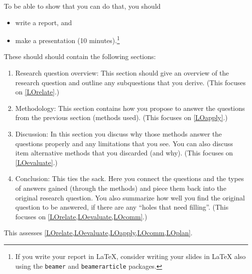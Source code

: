 To be able to show that you can do that, you should
\begin{itemize}
  \item write a report, and
  \item make a presentation (10 minutes).\footnote{%
      If you write your report in LaTeX, consider writing your slides in LaTeX 
      also using the \texttt{beamer} and \texttt{beamerarticle} packages.
    }
\end{itemize}
These should should contain the following sections:
\begin{enumerate}
  \item Research question overview:
    This section should give an overview of the research question and outline 
    any subquestions that you derive.
    (This focuses on \cref{LOrelate}.)
  \item Methodology:
    This section contains how you propose to answer the questions from the 
    previous section (methods used).
    (This focuses on \cref{LOapply}.)
  \item Discussion:
    In this section you discuss why those methods answer the questions properly 
    and any limitations that you see.
    You can also discuss item alternative methods that you discarded (and 
    why).
    (This focuses on \cref{LOevaluate}.)
  \item Conclusion:
    This ties the sack.
    Here you connect the questions and the types of answers gained (through the 
    methods) and piece them back into the original research question.
    You also summarize how well you find the original question to be answered, 
    if there are any \enquote{holes that need filling}.
    (This focuses on \cref{LOrelate,LOevaluate,LOcomm}.)
\end{enumerate}
This assesses \cref{LOrelate,LOevaluate,LOapply,LOcomm,LOplan}.

%
%

